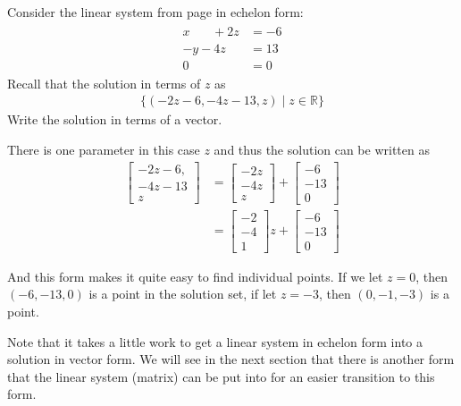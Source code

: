 \begin{example}
Consider the linear system  from page \pageref{ex:many:solutions} in echelon form:
%
\begin{align*}
\begin{split}
x\phantom{+2y} + 2z & = -6 \\
-y -4z & = 13 \\
0 & = 0 
\end{split} 
\end{align*}
Recall that the solution in terms of $z$ as
\begin{align*}
\{ (-2z-6, -4z-13,z) \; | \; z \in \mathbb{R} \} 
\end{align*}
Write the solution in terms of a vector. 

\solution 

There is one parameter in this case $z$ and thus the solution can be written as
%
\begin{align*}
\begin{bmatrix}
-2z-6, \\ -4z-13 \\ z
\end{bmatrix} & = \begin{bmatrix}
-2z \\ -4z \\ z
\end{bmatrix} + \begin{bmatrix}
-6 \\ -13 \\ 0 
\end{bmatrix} \\
& = \begin{bmatrix}
-2 \\ -4 \\ 1 
\end{bmatrix} z + \begin{bmatrix}
-6 \\ -13 \\ 0 
\end{bmatrix} 
\end{align*}

And this form makes it quite easy to find individual points.  If we let $z=0$, then $(-6,-13,0)$ is a point in the solution set, if let $z=-3$, then $(0,-1,-3)$ is a point.  


\end{example}


Note that it takes a little work to get a linear system in echelon form into a solution in vector form.  We will see in the next section that there is another form that the linear system (matrix) can be put into for an easier transition to this form.  
 
